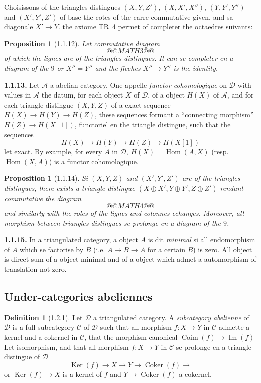 \documentclass[12pt,a4paper]{article}
\theoremstyle{plain}
\newtheorem{proposition}[theorem]{Proposition}
\theoremstyle{definition}
\newtheorem{definition}[theorem]{Definition}
\theoremstyle{remark}
\DeclareMathOperator{\Hom}{Hom}
\DeclareMathOperator{\Ker}{Ker}
\DeclareMathOperator{\Coker}{Coker}
\DeclareMathOperator{\Coim}{Coim}
\DeclareMathOperator{\pIm}{Im}
\newcommand{\cA}{\mathcal{A}}
\newcommand{\cC}{\mathcal{C}}
\newcommand{\cD}{\mathcal{D}}
\begin{document}
Choisissons of the triangles distingues $(X, Y, Z')$, $(X, X', X'')$, $(Y, Y', Y'')$ and $(X', Y', Z')$ of base the cotes of the carre commutative given, and sa diagonale $X' \to Y$. the axiome TR~4 permet of completer the octaedres suivants:

\newpage

\begin{proposition}[1.1.12]
Let commutative diagram
\[
@@MATH3@@
\]
of which the lignes are of the triangles distingues. It can se completer en a diagram of the $9$ or $X'' = Y''$ and the fleches $X'' \to Y''$ is the identity.
\end{proposition}

\smallskip

\noindent
\textbf{1.1.13.} Let $\cA$ a abelian category. One appelle \emph{functor cohomologique} on $\cD$ with values in $\cA$ the datum, for each object $X$ of $\cD$, of a object $H(X)$ of $\cA$, and for each triangle distingue $(X, Y, Z)$ of a exact sequence $H(X) \to H(Y) \to H(Z)$, these sequences formant a ``connecting morphism'' $H(Z) \to H(X[1])$, functoriel en the triangle distingue, such that the sequences
\[
H(X) \to H(Y) \to H(Z) \to H(X[1])
\]
let exact. By example, for every $A$ in $\cD$, $H(X) = \Hom(A, X)$ (resp. $\Hom(X, A)$) is a functor cohomologique.

\begin{proposition}[1.1.14]
Si $(X, Y, Z)$ and $(X', Y', Z')$ are of the triangles distingues, there exists a triangle distingue $(X \oplus X', Y \oplus Y', Z \oplus Z')$ rendant commutative the diagram
\[
@@MATH4@@
\]
and similarly with the roles of the lignes and colonnes echanges. Moreover, all morphism between triangles distingues se prolonge en a diagram of the $9$.
\end{proposition}

\smallskip

\noindent
\textbf{1.1.15.} In a triangulated category, a object $A$ is dit \emph{minimal} si all endomorphism of $A$ which se factorise by $B$ (i.e. $A \to B \to A$ for a certain $B$) is zero. All object is direct sum of a object minimal and of a object which admet a automorphism of translation not zero.

\smallskip

\subsection{Under-categories abeliennes}

\begin{definition}[1.2.1]
Let $\cD$ a triangulated category. A \emph{subcategory abelienne} of $\cD$ is a full subcategory $\cC$ of $\cD$ such that all morphism $f : X \to Y$ in $\cC$ admette a kernel and a cokernel in $\cC$, that the morphism canonical $\Coim(f) \to \pIm(f)$ Let isomorphism, and that all morphism $f : X \to Y$ in $\cC$ se prolonge en a triangle distingue of $\cD$
\[
\Ker(f) \to X \to Y \to \Coker(f) \to
\]
or $\Ker(f) \to X$ is a kernel of $f$ and $Y \to \Coker(f)$ a cokernel.
\end{definition}
\end{document}
